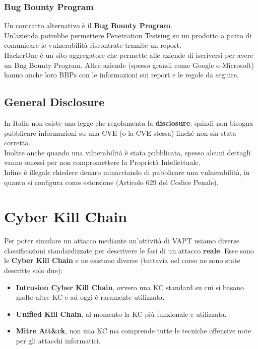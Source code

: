 \documentclass{article}
\begin{document}
\subsubsection{Bug Bounty Program}
Un contratto alternativo è il \textbf{Bug Bounty Program}.\\
Un'azienda potrebbe permettere Penetration Testsing su un prodotto a patto di comunicare le vulnerabilità riscontrate tramite un report.\\
HackerOne è un sito aggregatore che permette alle aziende di iscriversi per avere un Bug Bounty Program. Altre aziende (spesso grandi come Google o Microsoft) hanno anche loro BBPs con le informazioni sui report e le regole da seguire.

\subsection{General Disclosure}
In Italia non esiste una legge che regolamenta la \textbf{disclosure}: quindi non bisogna pubblicare informazioni su una CVE (o la CVE stessa) finché non sia stata corretta.\\
Inoltre anche quando una vilnerabilità è stata pubblicata, spesso alcuni dettagli vanno omessi per non compromettere la Proprietà Intellettuale.\\
Infine è illegale chiedere denaro minacciando di pubblicare una vulnerabilità, in quanto si configura come estorsione (Articolo 629 del Codice Penale).

\section{Cyber Kill Chain}
Per poter simulare un attacco mediante un'attività di VAPT usiamo diverse classificazioni standardizzate per descrivere le fasi di un attacco \textbf{reale}. Esse sono le \textbf{Cyber Kill Chain} e ne esistono diverse (tuttavia nel corso ne sono state descritte solo due):
\begin{itemize}
    \item \textbf{Intrusion Cyber Kill Chain}, ovvero una KC standard su cui si basano molte altre KC e ad oggi è raramente utilizzata.
    \item \textbf{Unified Kill Chain}, al momento la KC più funzionale e utilizzata.
    \item \textbf{Mitre Att\&ck}, non una KC ma comprende tutte le tecniche offensive note per gli attacchi informatici.
\end{itemize}
\end{document}
